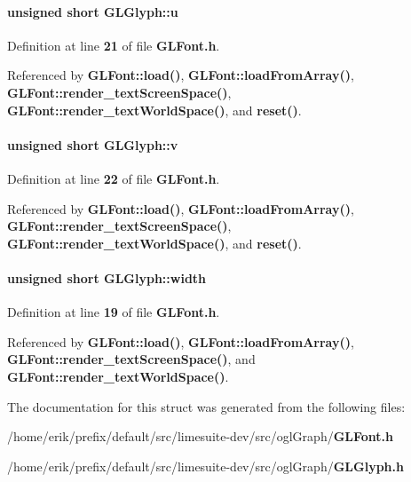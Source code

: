 \paragraph[{u}]{\setlength{\rightskip}{0pt plus 5cm}unsigned short G\+L\+Glyph\+::u}\label{structGLGlyph_adc2915b190f4c8a19819e8373d69a7a8}


Definition at line {\bf 21} of file {\bf G\+L\+Font.\+h}.



Referenced by {\bf G\+L\+Font\+::load()}, {\bf G\+L\+Font\+::load\+From\+Array()}, {\bf G\+L\+Font\+::render\+\_\+text\+Screen\+Space()}, {\bf G\+L\+Font\+::render\+\_\+text\+World\+Space()}, and {\bf reset()}.

\paragraph[{v}]{\setlength{\rightskip}{0pt plus 5cm}unsigned short G\+L\+Glyph\+::v}\label{structGLGlyph_a1ca6670dcce96e99622975d7d5ab949b}


Definition at line {\bf 22} of file {\bf G\+L\+Font.\+h}.



Referenced by {\bf G\+L\+Font\+::load()}, {\bf G\+L\+Font\+::load\+From\+Array()}, {\bf G\+L\+Font\+::render\+\_\+text\+Screen\+Space()}, {\bf G\+L\+Font\+::render\+\_\+text\+World\+Space()}, and {\bf reset()}.

\paragraph[{width}]{\setlength{\rightskip}{0pt plus 5cm}unsigned short G\+L\+Glyph\+::width}\label{structGLGlyph_ae54547d1bb82b20831063df8dd6f5b19}


Definition at line {\bf 19} of file {\bf G\+L\+Font.\+h}.



Referenced by {\bf G\+L\+Font\+::load()}, {\bf G\+L\+Font\+::load\+From\+Array()}, {\bf G\+L\+Font\+::render\+\_\+text\+Screen\+Space()}, and {\bf G\+L\+Font\+::render\+\_\+text\+World\+Space()}.



The documentation for this struct was generated from the following files\+:\begin{DoxyCompactItemize}
\item 
/home/erik/prefix/default/src/limesuite-\/dev/src/ogl\+Graph/{\bf G\+L\+Font.\+h}\item 
/home/erik/prefix/default/src/limesuite-\/dev/src/ogl\+Graph/{\bf G\+L\+Glyph.\+h}\end{DoxyCompactItemize}
